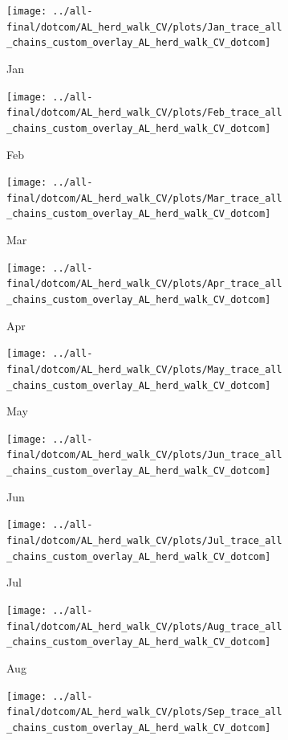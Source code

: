 \documentclass[ngerman]{ttlab-qualify}
\begin{document}
\newpage
\begin{figure}[H]
\centering
  \begin{subfigure}{.3\linewidth}
  \texttt{[image: ../all-final/dotcom/AL\_herd\_walk\_CV/plots/Jan\_trace\_all\_chains\_custom\_overlay\_AL\_herd\_walk\_CV\_dotcom]}\hfill
  \caption{Jan}
  \end{subfigure}
  \begin{subfigure}{.3\linewidth}
  \texttt{[image: ../all-final/dotcom/AL\_herd\_walk\_CV/plots/Feb\_trace\_all\_chains\_custom\_overlay\_AL\_herd\_walk\_CV\_dotcom]}\hfill
  \caption{Feb}
  \end{subfigure}
  \begin{subfigure}{.3\linewidth}
  \texttt{[image: ../all-final/dotcom/AL\_herd\_walk\_CV/plots/Mar\_trace\_all\_chains\_custom\_overlay\_AL\_herd\_walk\_CV\_dotcom]}\hfill
  \caption{Mar}
  \end{subfigure}\par\medskip
  \begin{subfigure}{.3\linewidth}
  \texttt{[image: ../all-final/dotcom/AL\_herd\_walk\_CV/plots/Apr\_trace\_all\_chains\_custom\_overlay\_AL\_herd\_walk\_CV\_dotcom]}\hfill
  \caption{Apr}
  \end{subfigure}
  \begin{subfigure}{.3\linewidth}
  \texttt{[image: ../all-final/dotcom/AL\_herd\_walk\_CV/plots/May\_trace\_all\_chains\_custom\_overlay\_AL\_herd\_walk\_CV\_dotcom]}\hfill
  \caption{May}
  \end{subfigure}
  \begin{subfigure}{.3\linewidth}
  \texttt{[image: ../all-final/dotcom/AL\_herd\_walk\_CV/plots/Jun\_trace\_all\_chains\_custom\_overlay\_AL\_herd\_walk\_CV\_dotcom]}\hfill
  \caption{Jun}
  \end{subfigure}\par\medskip
  \begin{subfigure}{.3\linewidth}
  \texttt{[image: ../all-final/dotcom/AL\_herd\_walk\_CV/plots/Jul\_trace\_all\_chains\_custom\_overlay\_AL\_herd\_walk\_CV\_dotcom]}\hfill
  \caption{Jul}
  \end{subfigure}
  \begin{subfigure}{.3\linewidth}
  \texttt{[image: ../all-final/dotcom/AL\_herd\_walk\_CV/plots/Aug\_trace\_all\_chains\_custom\_overlay\_AL\_herd\_walk\_CV\_dotcom]}\hfill
  \caption{Aug}
  \end{subfigure}
  \begin{subfigure}{.3\linewidth}
  \texttt{[image: ../all-final/dotcom/AL\_herd\_walk\_CV/plots/Sep\_trace\_all\_chains\_custom\_overlay\_AL\_herd\_walk\_CV\_dotcom]}\hfill

\end{subfigure}
\end{figure}
\end{document}
